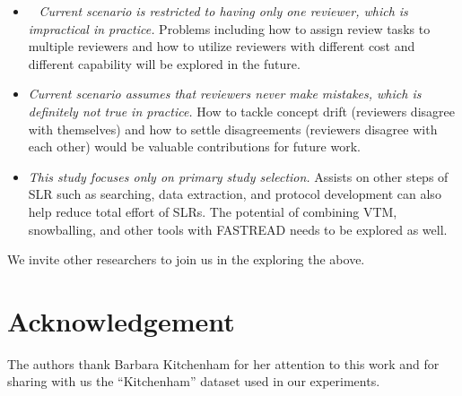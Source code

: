 \documentclass{svjour3}
\theoremstyle{break}
\newcommand{\respto}[1]{
\fcolorbox{black}{black!15}{
\label{response:#1}
\bf
  \scriptsize R-{#1}}~
}
\begin{document}
\begin{itemize}
\item
\respto{1e}{\em Current scenario is restricted to having only one reviewer, which is impractical in practice.} Problems including how to assign review tasks to multiple reviewers and how to utilize reviewers with different cost and different capability will be explored in the future.

\item
{\em Current scenario assumes that reviewers never make mistakes, which is definitely not true in practice.} How to tackle concept drift (reviewers disagree with themselves) and how to settle disagreements (reviewers disagree with each other) would be valuable contributions for future work.

\item
{\em This study focuses only on primary study selection.} Assists on other steps of SLR such as searching, data extraction, and protocol development can also help reduce total effort of SLRs. The potential of combining VTM, snowballing, and other tools with FASTREAD needs to be explored as well.


\end{itemize} We invite other researchers to join us in the exploring the above. 


\section*{Acknowledgement}
The authors thank Barbara Kitchenham for
her attention to this work and for
sharing with us the ``Kitchenham'' dataset used in our experiments.
 
% 

 






\appendix 


\newpage
\normalsize
\end{document}
